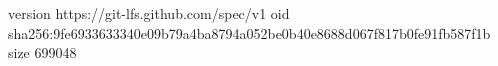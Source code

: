 version https://git-lfs.github.com/spec/v1
oid sha256:9fe6933633340e09b79a4ba8794a052be0b40e8688d067f817b0fe91fb587f1b
size 699048
